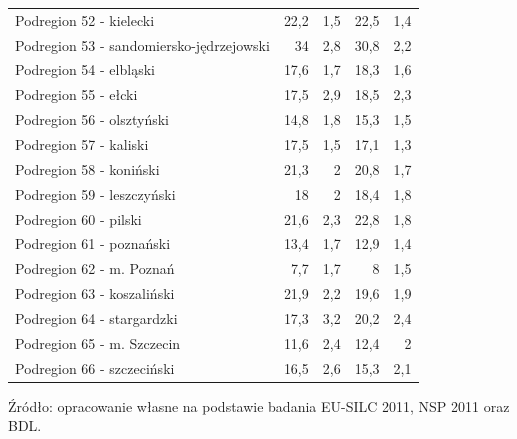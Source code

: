 \begin{center}
\begin{longtable}{p{6cm}rrrr}
Podregion 52 - kielecki                  & 22,2    & 1,5         & 22,5     & 1,4          \\
Podregion 53 - sandomiersko-jędrzejowski & 34      & 2,8         & 30,8     & 2,2          \\
Podregion 54 - elbląski                  & 17,6    & 1,7         & 18,3     & 1,6          \\
Podregion 55 - ełcki                     & 17,5    & 2,9         & 18,5     & 2,3          \\
Podregion 56 - olsztyński                & 14,8    & 1,8         & 15,3     & 1,5          \\
Podregion 57 - kaliski                   & 17,5    & 1,5         & 17,1     & 1,3          \\
Podregion 58 - koniński                  & 21,3    & 2           & 20,8     & 1,7          \\
Podregion 59 - leszczyński               & 18      & 2           & 18,4     & 1,8          \\
Podregion 60 - pilski                    & 21,6    & 2,3         & 22,8     & 1,8          \\
Podregion 61 - poznański                 & 13,4    & 1,7         & 12,9     & 1,4          \\
Podregion 62 - m. Poznań                 & 7,7     & 1,7         & 8        & 1,5          \\
Podregion 63 - koszaliński               & 21,9    & 2,2         & 19,6     & 1,9          \\
Podregion 64 - stargardzki               & 17,3    & 3,2         & 20,2     & 2,4          \\
Podregion 65 - m. Szczecin               & 11,6    & 2,4         & 12,4     & 2            \\
Podregion 66 - szczeciński               & 16,5    & 2,6         & 15,3     & 2,1          \\   
\hline
\end{longtable}
\small{Źródło: opracowanie własne na podstawie badania EU-SILC 2011, NSP 2011 oraz BDL.}
\end{center}

